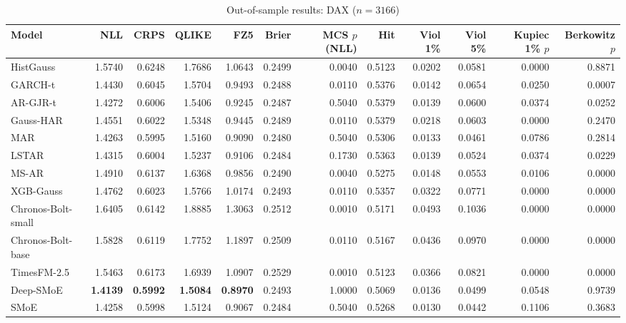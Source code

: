 \begin{table}[!htbp]\centering\scriptsize
\caption{Out-of-sample results: DAX ($n=3166$)}\label{tab:asset_dax}
\begin{adjustbox}{max width=\textwidth}
\begin{tabular}{lrrrrrrrrrrr}
\toprule
Model & NLL & CRPS & QLIKE & FZ5 & Brier & MCS $p$ (NLL) & Hit & Viol 1\% & Viol 5\% & Kupiec 1\% $p$ & Berkowitz $p$\\
\midrule
HistGauss & 1.5740 & 0.6248 & 1.7686 & 1.0643 & 0.2499 & 0.0040 & 0.5123 & 0.0202 & 0.0581 & 0.0000 & 0.8871\\
GARCH-t & 1.4430 & 0.6045 & 1.5704 & 0.9493 & 0.2488 & 0.0110 & 0.5376 & 0.0142 & 0.0654 & 0.0250 & 0.0007\\
AR-GJR-t & 1.4272 & 0.6006 & 1.5406 & 0.9245 & 0.2487 & 0.5040 & 0.5379 & 0.0139 & 0.0600 & 0.0374 & 0.0252\\
Gauss-HAR & 1.4551 & 0.6022 & 1.5348 & 0.9445 & 0.2489 & 0.0110 & 0.5379 & 0.0218 & 0.0603 & 0.0000 & 0.2470\\
MAR & 1.4263 & 0.5995 & 1.5160 & 0.9090 & 0.2480 & 0.5040 & 0.5306 & 0.0133 & 0.0461 & 0.0786 & 0.2814\\
LSTAR & 1.4315 & 0.6004 & 1.5237 & 0.9106 & 0.2484 & 0.1730 & 0.5363 & 0.0139 & 0.0524 & 0.0374 & 0.0229\\
MS-AR & 1.4910 & 0.6137 & 1.6368 & 0.9856 & 0.2490 & 0.0040 & 0.5275 & 0.0148 & 0.0553 & 0.0106 & 0.0000\\
XGB-Gauss & 1.4762 & 0.6023 & 1.5766 & 1.0174 & 0.2493 & 0.0110 & 0.5357 & 0.0322 & 0.0771 & 0.0000 & 0.0000\\
Chronos-Bolt-small & 1.6405 & 0.6142 & 1.8885 & 1.3063 & 0.2512 & 0.0010 & 0.5171 & 0.0493 & 0.1036 & 0.0000 & 0.0000\\
Chronos-Bolt-base & 1.5828 & 0.6119 & 1.7752 & 1.1897 & 0.2509 & 0.0110 & 0.5167 & 0.0436 & 0.0970 & 0.0000 & 0.0000\\
TimesFM-2.5 & 1.5463 & 0.6173 & 1.6939 & 1.0907 & 0.2529 & 0.0010 & 0.5123 & 0.0366 & 0.0821 & 0.0000 & 0.0000\\
Deep-SMoE & \textbf{1.4139} & \textbf{0.5992} & \textbf{1.5084} & \textbf{0.8970} & 0.2493 & 1.0000 & 0.5069 & 0.0136 & 0.0499 & 0.0548 & 0.9739\\
SMoE & 1.4258 & 0.5998 & 1.5124 & 0.9067 & 0.2484 & 0.5040 & 0.5268 & 0.0130 & 0.0442 & 0.1106 & 0.3683\\
\bottomrule
\end{tabular}
\end{adjustbox}
\end{table}
